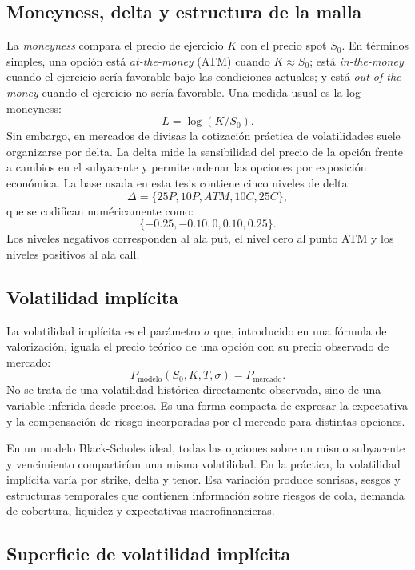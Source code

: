 \documentclass[a4paper,11pt]{article}
\begin{document}
\subsection{Moneyness, delta y estructura de la malla}

La \emph{moneyness} compara el precio de ejercicio \(K\) con el precio spot \(S_0\). En términos simples, una opción está \emph{at-the-money} (ATM) cuando \(K\approx S_0\); está \emph{in-the-money} cuando el ejercicio sería favorable bajo las condiciones actuales; y está \emph{out-of-the-money} cuando el ejercicio no sería favorable. Una medida usual es la log-moneyness:
\[
  L=\log(K/S_0).
\]
Sin embargo, en mercados de divisas la cotización práctica de volatilidades suele organizarse por delta. La delta mide la sensibilidad del precio de la opción frente a cambios en el subyacente y permite ordenar las opciones por exposición económica. La base usada en esta tesis contiene cinco niveles de delta:
\[
  \Delta=\{25P,10P,ATM,10C,25C\},
\]
que se codifican numéricamente como:
\[
  \{-0.25,-0.10,0,0.10,0.25\}.
\]
Los niveles negativos corresponden al ala put, el nivel cero al punto ATM y los niveles positivos al ala call.

\subsection{Volatilidad implícita}

La volatilidad implícita es el parámetro \(\sigma\) que, introducido en una fórmula de valorización, iguala el precio teórico de una opción con su precio observado de mercado:
\[
  P_{\text{modelo}}(S_0,K,T,\sigma)=P_{\text{mercado}}.
\]
No se trata de una volatilidad histórica directamente observada, sino de una variable inferida desde precios. Es una forma compacta de expresar la expectativa y la compensación de riesgo incorporadas por el mercado para distintas opciones.

En un modelo Black-Scholes ideal, todas las opciones sobre un mismo subyacente y vencimiento compartirían una misma volatilidad. En la práctica, la volatilidad implícita varía por strike, delta y tenor. Esa variación produce sonrisas, sesgos y estructuras temporales que contienen información sobre riesgos de cola, demanda de cobertura, liquidez y expectativas macrofinancieras.

\subsection{Superficie de volatilidad implícita}
\end{document}
